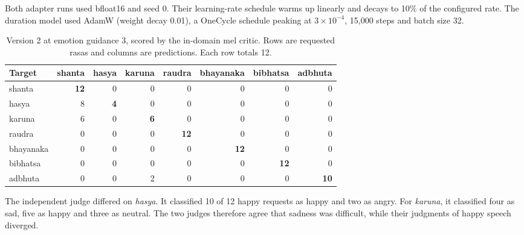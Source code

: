 \documentclass[11pt,a4paper]{article}
\begin{document}
Both adapter runs used bfloat16 and seed 0. Their learning-rate schedule warms up linearly and decays to 10\% of the configured rate. The duration model used AdamW (weight decay 0.01), a OneCycle schedule peaking at \(3\times10^{-4}\), 15,000 steps and batch size 32.

\begin{table}[!h]
\centering
\caption{Version 2 at emotion guidance 3, scored by the in-domain mel critic. Rows are requested rasas and columns are predictions. Each row totals 12.}
\label{tab:confusion}
{\small
\begin{tabular}{@{}lrrrrrrr@{}}
\toprule
Target & shanta & hasya & karuna & raudra & bhayanaka & bibhatsa & adbhuta \\
\midrule
shanta    & \textbf{12} & 0 & 0 & 0 & 0 & 0 & 0 \\
hasya     & 8 & \textbf{4} & 0 & 0 & 0 & 0 & 0 \\
karuna    & 6 & 0 & \textbf{6} & 0 & 0 & 0 & 0 \\
raudra    & 0 & 0 & 0 & \textbf{12} & 0 & 0 & 0 \\
bhayanaka & 0 & 0 & 0 & 0 & \textbf{12} & 0 & 0 \\
bibhatsa  & 0 & 0 & 0 & 0 & 0 & \textbf{12} & 0 \\
adbhuta   & 0 & 0 & 2 & 0 & 0 & 0 & \textbf{10} \\
\bottomrule
\end{tabular}}
\end{table}

The independent judge differed on \emph{hasya}. It classified 10 of 12 happy requests as happy and two as angry. For \emph{karuna}, it classified four as sad, five as happy and three as neutral. The two judges therefore agree that sadness was difficult, while their judgments of happy speech diverged.
\end{document}

